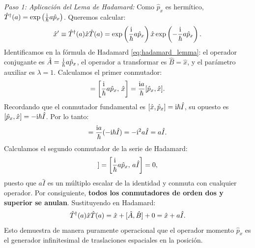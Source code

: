 \begin{ejemplobox}
    \textit{Paso 1: Aplicación del Lema de Hadamard:}
    Como $\hat{p}_x$ es hermítico, $\hat{T}^\dagger(a) = \exp\left(\frac{\mathrm{i}}{\hbar}a\hat{p}_x\right)$. Queremos calcular:
    \begin{equation}
        \hat{x}' \equiv \hat{T}^\dagger(a)\hat{x}\hat{T}(a) = \exp\left(\frac{\mathrm{i}}{\hbar}a\hat{p}_x\right)\hat{x}\exp\left(-\frac{\mathrm{i}}{\hbar}a\hat{p}_x\right).
    \end{equation}
    Identificamos en la fórmula de Hadamard \eqref{eq:hadamard_lemma}: el operador conjugante es $\hat{A} = \frac{\mathrm{i}}{\hbar}a\hat{p}_x$, el operador a transformar es $\hat{B} = \hat{x}$, y el parámetro auxiliar es $\lambda = 1$.
    Calculamos el primer conmutador:
    \begin{equation}
        [\hat{A}, \hat{B}] = \left[\frac{\iu}{\hbar}a\hat{p}_x, \, \hat{x}\right] = \frac{\iu a}{\hbar}[\hat{p}_x, \hat{x}].
    \end{equation}
    Recordando que el conmutador fundamental es $[\hat{x}, \hat{p}_x] = \mathrm{i}\hbar\hat{I}$, su opuesto es $[\hat{p}_x, \hat{x}] = -\mathrm{i}\hbar\hat{I}$. Por lo tanto:
    \begin{equation}
        [\hat{A}, \hat{B}] = \frac{\iu a}{\hbar}(-\iu\hbar\hat{I}) = -\iu^2 a \hat{I} = a\hat{I}.
    \end{equation}
    Calculamos el segundo conmutador de la serie de Hadamard:
    \begin{equation}
        [\hat{A}, [\hat{A}, \hat{B}]] = \left[\frac{\iu}{\hbar}a\hat{p}_x, \, a\hat{I}\right] = 0,
    \end{equation}
    puesto que $a\hat{I}$ es un múltiplo escalar de la identidad y conmuta con cualquier operador. Por consiguiente, \textbf{todos los conmutadores de orden dos y superior se anulan}. Sustituyendo en Hadamard:
    \begin{equation}
        \hat{T}^\dagger(a)\hat{x}\hat{T}(a) = \hat{x} + [\hat{A}, \hat{B}] + 0 = \hat{x} + a\hat{I}.
    \end{equation}
    Esto demuestra de manera puramente operacional que el operador momento $\hat{p}_x$ es el generador infinitesimal de traslaciones espaciales en la posición.


\end{ejemplobox}
